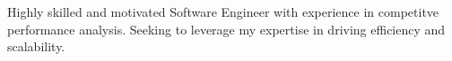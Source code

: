 

Highly skilled and motivated Software Engineer with experience in competitve performance analysis. Seeking to leverage my expertise in driving efficiency and scalability.